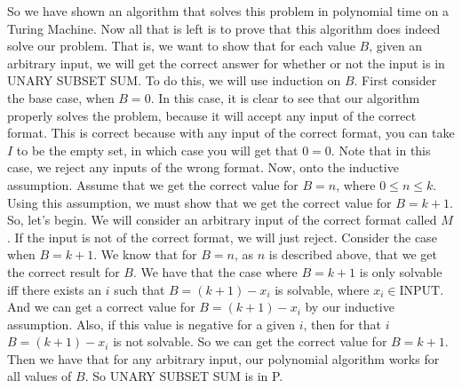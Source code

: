 \documentclass{article}
\begin{document}
So we have shown an algorithm that solves this problem in polynomial time on
a Turing Machine. Now all that is left is to prove that this algorithm does
indeed solve our problem. That is, we want to show that for each value $B$,
given an arbitrary input, we will get the correct answer for whether or
not the input is in UNARY SUBSET SUM. To do this, we will use induction on $B$.
First consider the base case, when $B = 0$. In this case, it is clear to see
that our algorithm properly solves the problem, because it will accept any
input of the correct format. This is correct because with any input of the
correct format, you can take $I$ to be the empty set, in which case you will
get that $0 = 0$. Note that in this case, we reject any inputs of the wrong
format. Now, onto the inductive assumption. Assume that we get the
correct value for $B = n$, where $0 \leq n \leq k$. Using this assumption,
we must show that we get the correct value for $B = k + 1$. So, let's begin.
We will consider an arbitrary input of the correct format called $M$. If
the input is not of the correct format, we will just reject.
Consider the case when $B = k + 1$. We know that for $B = n$, as $n$ is
described above, that we get the correct result for $B$. We have that
the case where $B = k + 1$ is only solvable iff there exists an $i$ such that
$B = (k + 1) - x_{i}$ is solvable, where $x_{i} \in \text{INPUT}$. And we can
get a correct value for $B = (k + 1) - x_{i}$ by our inductive assumption. Also, if
this value is negative for a given $i$, then for that $i$
$B = (k + 1) - x_{i}$ is not solvable.
So we can get the correct value for $B = k + 1$. Then we have that for any
arbitrary input, our polynomial algorithm works for all values of $B$. So UNARY
SUBSET SUM is in P.

\newpage
\end{document}
